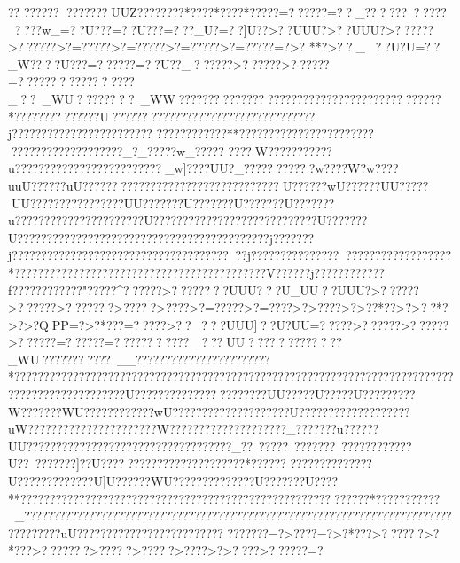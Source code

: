 {{{{{{{{{{{{{{{{{{{{{{{{{{{{{{{{{{{{{{{{{{{{{{{{{{{{{{{{{{{{{{{{{{{{{{{{{{{{{{{{{{{{{{{{{{{{{{{{{{{{{{{{{{{{{{{{{{{{{{{{{{{{{{{{{{{{{{{{{{{{{{{{{{{{{{{{{{{{{{{{{{{{{{{{{{{{{{{{{{{{{{{{{{{{{{{{{{{{{{{{{{{{{{{{{{{{{{{{{{{{{{{{{{{{{{{{{{{{{{{{{{{{{{{{{{{{{{{{{{{{{{{{{{{{{{{{{{{{{{{{{{{{{{{{{{{{{{{{{{{{{{{{{{{{{{{{{{{{{{{{{{{{{{{{{{{{{{{{{{{{{{{{{{{{{{{{{{{{{{{{{{{{{{{{{{{{{{{{{{{{{{{{{{{{{{{{{{{{{{{{{{{{{{{{{{{{{{{{{{{{{{{{{{{{{{{{{{{{{{{{{{{{{{{{{{{{{{{{{{{{{{{{{{{{{{{{{{{{{{{{{{{{{{{{{{{{{{{{{{{{{{{{{{{{{{{{{{{{{{{{{{{{{{{{{{{{{{{{{{{{{{{{{{{{{{{{{{{{{{{{{{{{{{{{{{{{{{{{{{{{{{{{{{{{{{{{{{{{{{{{{{{{{{{{{{{{{{{{{{{{{{{{{{{{{{{{{{{{{{{{{{{{{{{{{{{{{{{{{{{{{{{{{{{{{{{{{{{{{{{{{{{{{{{{{{{{{{{{{{{{{{{{{{{{{{{{{{{{{{{{{{{{{{{{{{{{{{{{{{{{{{{{{{{{{{{{{{{{{{{{{{{{{{{{{{{{{{{{{{{{{{{{{{{{{{{{{{{{{{{{{{{{{{{{{{{{{{{{{{{{{{{{{{{{{{{{{{{{{{{{{{{{{{{{{{{{{{{{{{{{{{{{{{{{{{{{{{{{{{{{{{{{{{{{{{{{{{{{{{{{{{{{{{{{{{{{{{{{{{{{{{{{{{{{{{{{{{{{{{{{{{{{{{{{{{{{{{{{{{{{{{{{{{{{{{{{{{{{{{{{{{{{{{{{{{{{{{{{{{{{{{{{{{{{{{{{{{{{{{{{{{{{{{{{{{{{{{{{{{{{{{{{{{{{{{{{{{{{{{{{{{{{{{{{{{{{{{{{{{{{{{{{{{{{{{{{{{{{{{{{{{{{{{{{{{{{{{{{{{{{{{{{{{{{{{{{{{{{{{{{{{{{{{{{{{{{{{{{{{{{{{{{{{{{{{{{{{{{{{{{{{{{{{{{{{{{{{{{{{{{{{{{{{{{{{{{{{{{{{{{{{{{{{{{{{{{{{{{{{{{{{{{{{{{{{{{{{{{{{{{{{{{{{{{{{{{{{{{{{{{{{{{{{{{{{{{{{{??  ??????
????   ???UUZ??? ????? *???? *????  *????   ?=??????=??_???????????????w_=??U???=??U???=???_U?=??]U??>??UUU?>??UUU?>??????>??????>?=?????>?=?????>?=?????>?=?????=?>?
**?>??_??U?U=??_W????U???=??????=??U??_??????>??????>??????=?????????????????_??~_WU????????~_WW???????????????????????????????????????????*??????????????U??????????????????????????????????j????????????????????????
????????????**??????????????????????????????????????????_?_?????w_?????
????W???????????u?????????????????????????_w]????UU?_???????????w????W?w????uuU??????uU????????????????? ??????? ?????????U??????wU??????UU?????UU????   ?????   ???????UU???????U???????U???????U???????u??????????????????????U????????????????????????????U???????U???????????????????????????????????????????j???????j???????????????????????????????????????j?????????????????????????????????*???????????????????????????????????????????V??????j????????????f???????????? "????   ?^??????>????????UUU???U_UU??UUU?>??????>??????>???????>?????>????>?=?????>?=????>?>? ???>?>??*??>?>??*?>?>?QPP=?>?*???=?????>?????UUU]??U?UU=?????>??????>??????>??????=??????=???????????_???UU??  ???????????_WU???????????~__???????????????????????*????????????????????????????????????????????????????????????????????    ????????????????????   ???????U??????  ?????? ??????????UU?????}U?????U?????????W???????WU????????????wU????????????????????U???????????????????}uW??????????????????????W?????????? ??????????_???????u??????UU????  ??????  ?????????????????????????_??~?????~???????~????????????U??~???????]??U?????? ???? ??????? ??????? *??????  
??????????????U?????????????U]U??????WU??????????????U???????U????**?????????????????????????????????   ??????????????????????????*???????????_???? ??????????????????????????????????????????????????????????????????????????????uU?????????????????????????
???????=?>????=?>?*???>??????>?*???>???????>?????>?????>????>?>????>??????=?}}}}}}}}}}}}}}}}}}}}}}}}}}}}}}}}}}}}}}}}}}}}}}}}}}}}}}}}}}}}}}}}}}}}}}}}}}}}}}}}}}}}}}}}}}}}}}}}}}}}}}}}}}}}}}}}}}}}}}}}}}}}}}}}}}}}}}}}}}}}}}}}}}}}}}}}}}}}}}}}}}}}}}}}}}}}}}}}}}}}}}}}}}}}}}}}}}}}}}}}}}}}}}}}}}}}}}}}}}}}}}}}}}}}}}}}}}}}}}}}}}}}}}}}}}}}}}}}}}}}}}}}}}}}}}}}}}}}}}}}}}}}}}}}}}}}}}}}}}}}}}}}}}}}}}}}}}}}}}}}}}}}}}}}}}}}}}}}}}}}}}}}}}}}}}}}}}}}}}}}}}}}}}}}}}}}}}}}}}}}}}}}}}}}}}}}}}}}}}}}}}}}}}}}}}}}}}}}}}}}}}}}}}}}}}}}}}}}}}}}}}}}}}}}}}}}}}}}}}}}}}}}}}}}}}}}}}}}}}}}}}}}}}}}}}}}}}}}}}}}}}}}}}}}}}}}}}}}}}}}}}}}}}}}}}}}}}}}}}}}}}}}}}}}}}}}}}}}}}}}}}}}}}}}}}}}}}}}}}}}}}}}}}}}}}}}}}}}}}}}}}}}}}}}}}}}}}}}}}}}}}}}}}}}}}}}}}}}}}}}}}}}}}}}}}}}}}}}}}}}}}}}}}}}}}}}}}}}}}}}}}}}}}}}}}}}}}}}}}}}}}}}}}}}}}}}}}}}}}}}}}}}}}}}}}}}}}}}}}}}}}}}}}}}}}}}}}}}}}}}}}}}}}}}}}}}}}}}}}}}}}}}}}}}}}}}}}}}}}}}}}}}}}}}}}}}}}}}}}}}}}}}}}}}}}}}}}}}}}}}}}}}}}}}}}}}}}}}}}}}}}}}}}}}}}}}}}}}}}}}}}}}}}}}}}}}}}}}}}}}}}}}}}}}}}}}}}}}}}}}}}}}}}}}}}}}}}}}}}}}}}}}}}}}}}}}}}}}}}}}}}}}}}}}}}}}}}}}}}}}}}}}}}}}}}}}}}}}}}}}}}}}}}}}}}}}}}}}}}}}}}}}}}}}}}}}}}}}}}}}}}}}}}}}}}}}}}}}}}}}}}}}}}}}}}}}}}}}}}}}}}}}}}}}}}}}}}}}}}}}}}}}}}}}}}}}}}}}}}}}}}}}}}}}}}}}}}}}}}}}}}}}}}}}}}}}}}}}}}}}}}}}}}}}}}}}}}}}}}}}}}}}}}}}}}}}}}}}}}}}}}}}}}}}}}}}}}}}}}}}}}}}}}}}}}}}}}}}}}}}}}}}}}}}}}}}}}}}}}}}}}}}}}}}}}}}}}}}}}}}}}}}}}}}}}}}}
